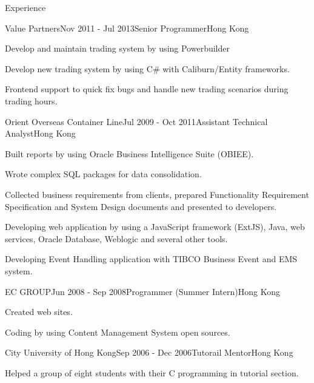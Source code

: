 \documentclass{resume} %
\begin{document}
\begin{rSection}{Experience}

\begin{rSubsection}{Value Partners}{Nov 2011 - Jul 2013}{Senior Programmer}{Hong Kong}
\item Develop and maintain trading system by using Powerbuilder
\item Develop new trading system by using C\# with Caliburn/Entity frameworks.
\item Frontend support to quick fix bugs and handle new trading scenarios during trading hours.
\end{rSubsection}


\begin{rSubsection}{Orient Overseas Container Line}{Jul 2009 - Oct 2011}{Assistant Technical Analyst}{Hong Kong}
\item Built reports by using Oracle Business Intelligence Suite (OBIEE).
\item Wrote complex SQL packages for data consolidation.
\item Collected business requirements from clients, prepared Functionality Requirement Specification and System Design documents and presented to developers.
\item Developing web application by using a JavaScript framework (ExtJS), Java, web services, Oracle Database, Weblogic and several other tools.
\item Developing Event Handling application with TIBCO Business Event and EMS system.
\end{rSubsection}


\begin{rSubsection}{EC GROUP}{Jun 2008 - Sep 2008}{Programmer (Summer Intern)}{Hong Kong}
\item Created web sites.
\item Coding by using Content Management System open sources.
\end{rSubsection}


\begin{rSubsection}{City University of Hong Kong}{Sep 2006 - Dec 2006}{Tutorail Mentor}{Hong Kong}
\item Helped a group of eight students with their C programming in tutorial section.
\end{rSubsection}

\end{rSection}
\end{document}

